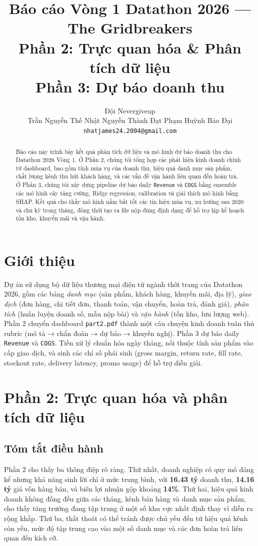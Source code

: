\documentclass{article}
\title{Báo cáo Vòng 1 Datathon 2026 --- The Gridbreakers\\
\large Phần 2: Trực quan hóa \& Phân tích dữ liệu \\
\large Phần 3: Dự báo doanh thu}
\author{%
  Đội Nevergiveup \\
  Trần Nguyễn Thế Nhật \quad Nguyễn Thành Đạt \quad Phạm Huỳnh Bảo Đại \\
  \texttt{nhatjames24.2004@gmail.com}
}
\begin{document}
\maketitle

\begin{abstract}
Báo cáo này trình bày kết quả phân tích dữ liệu và mô hình dự báo doanh thu cho Datathon 2026 Vòng 1. Ở Phần 2, chúng tôi tổng hợp các phát hiện kinh doanh chính từ dashboard, bao gồm tính mùa vụ của doanh thu, hiệu quả danh mục sản phẩm, chất lượng kênh thu hút khách hàng, và các vấn đề vận hành liên quan đến hoàn trả. Ở Phần 3, chúng tôi xây dựng pipeline dự báo daily \texttt{Revenue} và \texttt{COGS} bằng ensemble các mô hình cây tăng cường, Ridge regression, calibration và giải thích mô hình bằng SHAP. Kết quả cho thấy mô hình nắm bắt tốt các tín hiệu mùa vụ, xu hướng sau 2020 và chu kỳ trong tháng, đồng thời tạo ra file nộp đúng định dạng để hỗ trợ lập kế hoạch tồn kho, khuyến mãi và vận hành.
\end{abstract}


\section{Giới thiệu}
Dự án sử dụng bộ dữ liệu thương mại điện tử ngành thời trang của Datathon 2026, gồm các bảng \emph{danh mục} (sản phẩm, khách hàng, khuyến mãi, địa lý), \emph{giao dịch} (đơn hàng, chi tiết đơn, thanh toán, vận chuyển, hoàn trả, đánh giá), \emph{phân tích} (huấn luyện doanh số, mẫu nộp bài) và \emph{vận hành} (tồn kho, lưu lượng web). Phần 2 chuyển dashboard \texttt{part2.pdf} thành một câu chuyện kinh doanh tuân thủ rubric (mô tả → chẩn đoán → dự báo → khuyến nghị). Phần 3 dự báo daily \texttt{Revenue} và \texttt{COGS}. Tiền xử lý chuẩn hóa ngày tháng, nối thuộc tính sản phẩm vào cấp giao dịch, và sinh các chỉ số phái sinh (gross margin, return rate, fill rate, stockout rate, delivery latency, promo usage) để hỗ trợ diễn giải.

\section{Phần 2: Trực quan hóa và phân tích dữ liệu}

\subsection{Tóm tắt điều hành}
Phần 2 cho thấy ba thông điệp rõ ràng. Thứ nhất, doanh nghiệp có quy mô đáng kể nhưng khả năng sinh lời chỉ ở mức trung bình, với \textbf{16.43 tỷ} doanh thu, \textbf{14.16 tỷ} giá vốn hàng bán, và biên lợi nhuận gộp khoảng \textbf{14\%}. Thứ hai, hiệu quả kinh doanh không đồng đều giữa các tháng, kênh bán hàng và danh mục sản phẩm, cho thấy tăng trưởng đang tập trung ở một số khu vực nhất định thay vì diễn ra rộng khắp. Thứ ba, thất thoát có thể tránh được chủ yếu đến từ hiệu quả kênh còn yếu, mức độ tập trung cao vào một số danh mục và các đơn hoàn trả liên quan đến kích cỡ.
\end{document}
